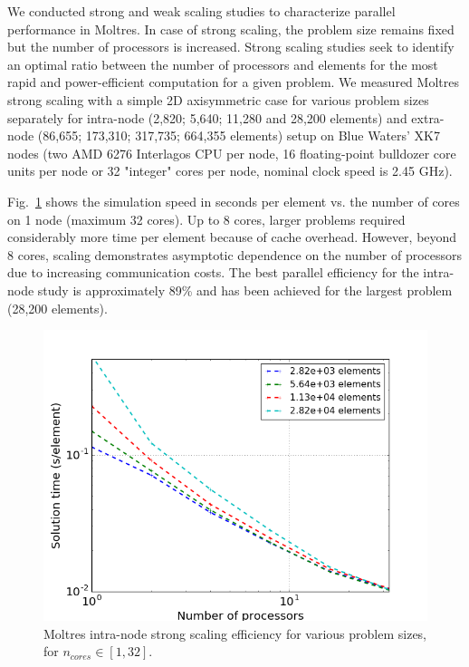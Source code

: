 \documentclass{anstrans}
\begin{document}
We conducted strong and weak scaling studies to characterize parallel
performance in Moltres.
In case of strong scaling, the problem size remains fixed but the number of
processors is increased. Strong scaling studies seek to identify an
optimal ratio between the number of processors and elements for the most
rapid and power-efficient computation for a given problem. We measured
Moltres strong scaling with a simple 2D axisymmetric
case for various problem sizes separately for intra-node (2,820; 5,640;
11,280 and 28,200 elements) and extra-node (86,655; 173,310; 317,735;
664,355 elements) setup on Blue Waters' XK7 nodes (two AMD 6276 Interlagos
CPU per node, 16 floating-point bulldozer core units per node or 32 "integer"
cores per node, nominal clock speed is 2.45 GHz).

Fig.~\ref{fig:intra_strong_scaling} shows the simulation speed in seconds
per element vs. the number of cores on 1 node (maximum 32 cores). Up to 8
cores, larger problems required considerably more time per
element because of cache overhead. However, beyond 8 cores, scaling demonstrates
asymptotic dependence on the number of processors due to increasing
communication costs. The best parallel efficiency for the intra-node study
is approximately 89\% and has been achieved for the largest problem
(28,200 elements).

\begin{figure}[htpb!]
  \centering
  \includegraphics[width=\linewidth]{intra-node_strong.png}
  \caption{Moltres intra-node strong scaling efficiency for various problem
        sizes, for $n_{cores} \in [1,32]$.}
  \label{fig:intra_strong_scaling}
\end{figure}
\end{document}
